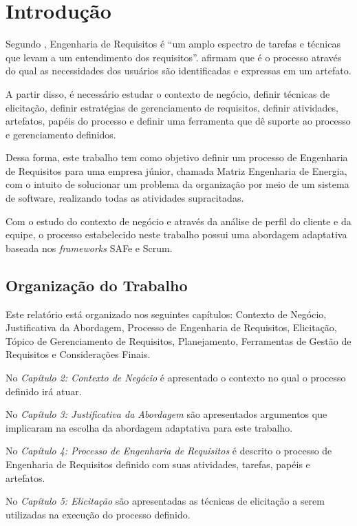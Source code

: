 \chapter[Introdução]{Introdução}

Segundo , Engenharia de Requisitos é ``um amplo
espectro de tarefas e técnicas que levam a um entendimento dos requisitos''.
 afirmam que é o processo através do qual as necessidades dos usuários 
são identificadas e expressas em um artefato.

A partir disso, é necessário estudar o contexto de negócio, definir técnicas de elicitação, 
definir estratégias de gerenciamento de requisitos, definir atividades, artefatos, papéis do processo
e definir uma ferramenta que dê suporte ao processo e gerenciamento definidos.

Dessa forma, este trabalho tem como objetivo definir um processo de Engenharia de Requisitos para uma empresa júnior, chamada
Matriz Engenharia de Energia, com o intuito de solucionar um problema da organização por meio de um sistema de software,
realizando todas as atividades supracitadas.

Com o estudo do contexto de negócio e através da análise de perfil do cliente e da equipe, o processo
estabelecido neste trabalho possui uma abordagem adaptativa baseada nos \textit{frameworks} SAFe e Scrum.

\section{Organização do Trabalho}

Este relatório está organizado nos seguintes capítulos: Contexto de Negócio, Justificativa da Abordagem, 
Processo de Engenharia de Requisitos, Elicitação, Tópico de Gerenciamento de Requisitos,
Planejamento, Ferramentas de Gestão de Requisitos e Considerações Finais.

No \textit{Capítulo 2: Contexto de Negócio} é apresentado o contexto no qual o processo
definido irá atuar.

No \textit{Capítulo 3: Justificativa da Abordagem} são apresentados argumentos
que implicaram na escolha da abordagem adaptativa para este trabalho.

No \textit{Capítulo 4: Processo de Engenharia de Requisitos} é descrito o processo de Engenharia
de Requisitos definido com suas atividades, tarefas, papéis e artefatos.

No \textit{Capítulo 5: Elicitação} são apresentadas as técnicas de elicitação
a serem utilizadas na execução do processo definido.

